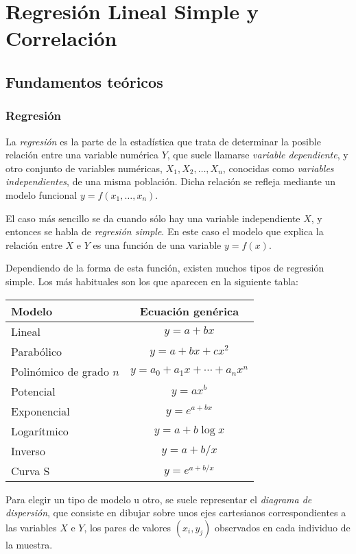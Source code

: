\chapter{Regresión Lineal Simple y Correlación}

\section{Fundamentos teóricos}
\subsection{Regresión}
La \emph{regresión} es la parte de la estadística que trata de determinar la posible relación entre una variable
numérica $Y$, que suele llamarse \emph{variable dependiente}, y otro conjunto de variables numéricas, $X_1,
X_2,\ldots,X_n$, conocidas como \emph{variables independientes}, de una misma población. 
Dicha relación se refleja mediante un modelo funcional $y=f(x_1,\ldots,x_n)$.

El caso más sencillo se da cuando sólo hay una variable independiente $X$, y entonces se habla de \emph{regresión
simple}. 
En este caso el modelo que explica la relación entre $X$ e $Y$ es una función de una variable $y=f(x)$.

Dependiendo de la forma de esta función, existen muchos tipos de regresión simple.
Los más habituales son los que aparecen en la siguiente tabla:
\begin{center}
\begin{tabular}{|l|c|}
\hline
 Modelo      &     Ecuación genérica      \\
\hline\hline
 Lineal                  &          $y=a+bx$          \\
\hline
 Parabólico              &       $y=a+bx+cx^2$        \\
\hline
 Polinómico de grado $n$ & $y=a_0+a_1x+\cdots+a_nx^n$ \\
\hline
 Potencial               &       $y=ax^b$       \\
\hline
 Exponencial             &     $y=e^{a+bx}$      \\
\hline
 Logarítmico             &       $y=a+b\log x$        \\
\hline
Inverso & $y=a+b/x$ \\
\hline
Curva S & $y= e^{a+b/x}$ \\
\hline
\end{tabular}
\end{center}

Para elegir un tipo de modelo u otro, se suele representar el \emph{diagrama de dispersión}, que consiste en dibujar
sobre unos ejes cartesianos correspondientes a las variables $X$ e $Y$, los pares de valores $(x_i,y_j)$ observados en
cada individuo de la muestra.


